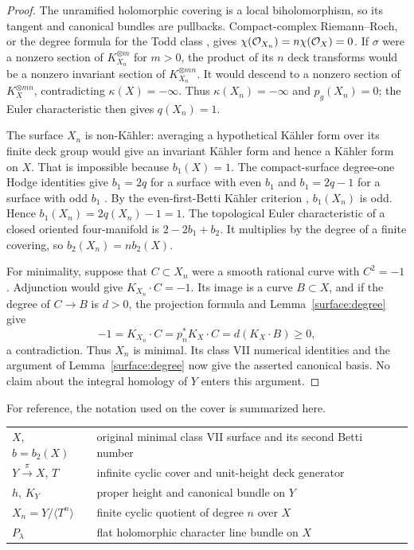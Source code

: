 \begin{proof}
The unramified holomorphic covering is a local biholomorphism, so its
tangent and canonical bundles are pullbacks. Compact-complex
Riemann--Roch, or the degree formula for the Todd class
\cite[\S4]{AtiyahSingerIII1968}, gives
$\chi(\mathcal O_{X_n})=n\chi(\mathcal O_X)=0$.
If $\sigma$ were a nonzero section of $K_{X_n}^{\otimes m}$ for $m>0$,
the product of its $n$ deck transforms would be a nonzero invariant
section of $K_{X_n}^{\otimes mn}$. It would descend to a nonzero section
of $K_X^{\otimes mn}$, contradicting $\kappa(X)=-\infty$.
Thus $\kappa(X_n)=-\infty$ and $p_g(X_n)=0$; the Euler characteristic
then gives $q(X_n)=1$.

The surface $X_n$ is non-K\"ahler: averaging a hypothetical K\"ahler form
over its finite deck group would give an invariant K\"ahler form and
hence a K\"ahler form on $X$. That is impossible because $b_1(X)=1$.
The compact-surface degree-one Hodge identities give
$b_1=2q$ for a surface with even $b_1$ and $b_1=2q-1$ for a surface with
odd $b_1$ \cite{BHPV2004}. By the even-first-Betti K\"ahler criterion
\cite[Theorem~11]{Buchdahl1999}, $b_1(X_n)$ is odd. Hence
$b_1(X_n)=2q(X_n)-1=1$.
The topological Euler characteristic of a closed oriented four-manifold
is $2-2b_1+b_2$. It multiplies by the degree of a finite covering, so
$b_2(X_n)=n b_2(X)$.

For minimality, suppose that $C\subset X_n$ were a smooth rational
curve with $C^2=-1$. Adjunction would give $K_{X_n}\cdot C=-1$.
Its image is a curve $B\subset X$, and if the degree of $C\to B$ is
$d>0$, the projection formula and Lemma~\ref{surface:degree} give
\[
 -1=K_{X_n}\cdot C=p_n^*K_X\cdot C=d(K_X\cdot B)\geq0,
\]
a contradiction. Thus $X_n$ is minimal. Its class VII numerical
identities and the argument of Lemma~\ref{surface:degree} now give the
asserted canonical basis. No claim about the integral homology of $Y$
enters this argument.
\end{proof}

For reference, the notation used on the cover is summarized here.
\begin{center}
\small
\begin{tabular}{@{}ll@{}}
\hline
$X$, $b=b_2(X)$ & original minimal class VII surface and its second Betti number \\
$Y\xrightarrow{\pi}X$, $T$ & infinite cyclic cover and unit-height deck generator \\
$h$, $K_Y$ & proper height and canonical bundle on $Y$ \\
$X_n=Y/\langle T^n\rangle$ & finite cyclic quotient of degree $n$ over $X$ \\
$P_\lambda$ & flat holomorphic character line bundle on $X$ \\
\hline
\end{tabular}
\end{center}
